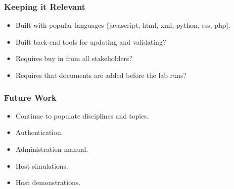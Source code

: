 \documentclass{beamer} %
\begin{document}
\begin{frame}
\frametitle{Keeping it Relevant}
	\begin{itemize}
		\item Built with popular languages (javascript, html, xml, python, css, php).
		\item Built back-end tools for updating and validating?
		\item Requires buy in from all stakeholders?
		\item Requires that documents are added before the lab runs?
	\end{itemize}
\end{frame}

\begin{frame}
\frametitle{Future Work}
	\begin{itemize}
		\item Continue to populate disciplines and topics.
		\item Authentication.
		\item Administration manual.
		\item Host simulations.
		\item Host demonstrations.
	\end{itemize}
\end{frame}
\end{document}

